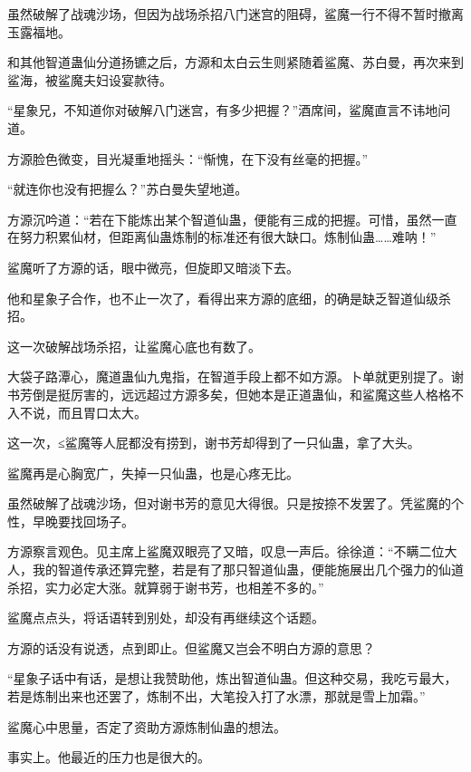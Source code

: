 
\begin{this_body}

虽然破解了战魂沙场，但因为战场杀招八门迷宫的阻碍，鲨魔一行不得不暂时撤离玉露福地。

和其他智道蛊仙分道扬镳之后，方源和太白云生则紧随着鲨魔、苏白曼，再次来到鲨海，被鲨魔夫妇设宴款待。

“星象兄，不知道你对破解八门迷宫，有多少把握？”酒席间，鲨魔直言不讳地问道。

方源脸色微变，目光凝重地摇头：“惭愧，在下没有丝毫的把握。”

“就连你也没有把握么？”苏白曼失望地道。

方源沉吟道：“若在下能炼出某个智道仙蛊，便能有三成的把握。可惜，虽然一直在努力积累仙材，但距离仙蛊炼制的标准还有很大缺口。炼制仙蛊……难呐！”

鲨魔听了方源的话，眼中微亮，但旋即又暗淡下去。

他和星象子合作，也不止一次了，看得出来方源的底细，的确是缺乏智道仙级杀招。

这一次破解战场杀招，让鲨魔心底也有数了。

大袋子路潭心，魔道蛊仙九鬼指，在智道手段上都不如方源。卜单就更别提了。谢书芳倒是挺厉害的，远远超过方源多矣，但她本是正道蛊仙，和鲨魔这些人格格不入不说，而且胃口太大。

这一次，≤鲨魔等人屁都没有捞到，谢书芳却得到了一只仙蛊，拿了大头。

鲨魔再是心胸宽广，失掉一只仙蛊，也是心疼无比。

虽然破解了战魂沙场，但对谢书芳的意见大得很。只是按捺不发罢了。凭鲨魔的个性，早晚要找回场子。

方源察言观色。见主席上鲨魔双眼亮了又暗，叹息一声后。徐徐道：“不瞒二位大人，我的智道传承还算完整，若是有了那只智道仙蛊，便能施展出几个强力的仙道杀招，实力必定大涨。就算弱于谢书芳，也相差不多的。”

鲨魔点点头，将话语转到别处，却没有再继续这个话题。

方源的话没有说透，点到即止。但鲨魔又岂会不明白方源的意思？

“星象子话中有话，是想让我赞助他，炼出智道仙蛊。但这种交易，我吃亏最大，若是炼制出来也还罢了，炼制不出，大笔投入打了水漂，那就是雪上加霜。”

鲨魔心中思量，否定了资助方源炼制仙蛊的想法。

事实上。他最近的压力也是很大的。


\end{this_body}
